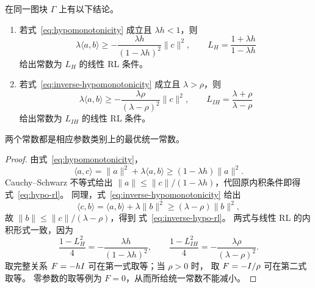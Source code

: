 \begin{proposition}[原图和逆图缺陷给出的线性 RL 常数]
\label{prop:hypo-to-rl}
在同一图块 $\Gamma$ 上有以下结论。
\begin{enumerate}
 \item 若式~\eqref{eq:hypomonotonicity} 成立且 $\lambda h<1$，则
 \begin{equation}
  \lambda\langle a,b\rangle
  \ge-\frac{\lambda h}{(1-\lambda h)^2}\|c\|^2,
  \qquad L_H=\frac{1+\lambda h}{1-\lambda h}
  \label{eq:hypo-rl}
 \end{equation}
 给出常数为 $L_H$ 的线性 RL 条件。
 \item 若式~\eqref{eq:inverse-hypomonotonicity} 成立且 $\lambda>\rho$，则
 \begin{equation}
  \lambda\langle a,b\rangle
  \ge-\frac{\lambda\rho}{(\lambda-\rho)^2}\|c\|^2,
  \qquad L_{IH}=\frac{\lambda+\rho}{\lambda-\rho}
  \label{eq:inverse-hypo-rl}
 \end{equation}
 给出常数为 $L_{IH}$ 的线性 RL 条件。
\end{enumerate}
两个常数都是相应参数类别上的最优统一常数。
\end{proposition}

\begin{proof}
由式~\eqref{eq:hypomonotonicity}，
\[
 \langle a,c\rangle
 =\|a\|^2+\lambda\langle a,b\rangle
 \ge(1-\lambda h)\|a\|^2.
\]
Cauchy--Schwarz 不等式给出
$\|a\|\le\|c\|/(1-\lambda h)$，代回原内积条件即得
式~\eqref{eq:hypo-rl}。
同理，式~\eqref{eq:inverse-hypomonotonicity} 给出
\[
 \langle c,b\rangle
 =\langle a,b\rangle+\lambda\|b\|^2
 \ge(\lambda-\rho)\|b\|^2,
\]
故 $\|b\|\le\|c\|/(\lambda-\rho)$，得到
式~\eqref{eq:inverse-hypo-rl}。
两式与线性 RL 的内积形式一致，因为
\[
 \frac{1-L_H^2}{4}=-\frac{\lambda h}{(1-\lambda h)^2},
 \qquad
 \frac{1-L_{IH}^2}{4}=-\frac{\lambda\rho}{(\lambda-\rho)^2}.
\]
取完整关系 $F=-hI$ 可在第一式取等；当 $\rho>0$ 时，
取 $F=-I/\rho$ 可在第二式取等。
零参数的取等例为 $F=0$，从而所给统一常数不能减小。
\end{proof}


